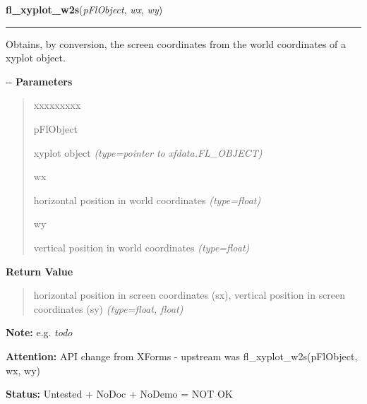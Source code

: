     \label{xformslib:flxyplot:fl_xyplot_w2s}

    \vspace{0.5ex}

\hspace{.8\funcindent}\begin{boxedminipage}{\funcwidth}

    \raggedright \textbf{fl\_xyplot\_w2s}(\textit{pFlObject}, \textit{wx}, \textit{wy})

    \vspace{-1.5ex}

    \rule{\textwidth}{0.5\fboxrule}
\setlength{\parskip}{2ex}

Obtains, by conversion, the screen coordinates from the world
coordinates of a xyplot object.

-{}-
\setlength{\parskip}{1ex}
      \textbf{Parameters}
      \vspace{-1ex}

      \begin{quote}
        \begin{Ventry}{xxxxxxxxx}

          \item[pFlObject]


xyplot object
            {\it (type=pointer to xfdata.FL\_OBJECT)}

          \item[wx]


horizontal position in world coordinates
            {\it (type=float)}

          \item[wy]


vertical position in world coordinates
            {\it (type=float)}

        \end{Ventry}

      \end{quote}

      \textbf{Return Value}
    \vspace{-1ex}

      \begin{quote}

horizontal position in screen coordinates (sx), vertical position
in screen coordinates (sy)
      {\it (type=float, float)}

      \end{quote}

\textbf{Note:} 
e.g. \emph{todo}


\textbf{Attention:} 
API change from XForms - upstream was
fl\_xyplot\_w2s(pFlObject, wx, wy)


\textbf{Status:} 
Untested + NoDoc + NoDemo = NOT OK


    \end{boxedminipage}

